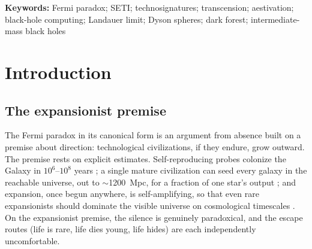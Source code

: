 \documentclass[11pt]{article}
\begin{document}
\bigskip
\noindent\textbf{Keywords:} Fermi paradox; SETI; technosignatures; transcension; aestivation; black-hole computing; Landauer limit; Dyson spheres; dark forest; intermediate-mass black holes

\newpage
\tableofcontents
\newpage

\section{Introduction}
\label{sec:intro}

\subsection{The expansionist premise}
\label{sec:expansionist}

The Fermi paradox in its canonical form \citep{Hart1975,Tipler1980,Brin1983,Webb2015,Cirkovic2018,Forgan2019} is an argument from absence built on a premise about direction: technological civilizations, if they endure, grow outward. The premise rests on explicit estimates. Self-reproducing probes colonize the Galaxy in $10^{6}$--$10^{8}$ years \citep{Tipler1980,Freitas1980,Freitas1982}; a single mature civilization can seed every galaxy in the reachable universe, out to $\sim$1200~Mpc, for a fraction of one star's output \citep{Armstrong2013}; and expansion, once begun anywhere, is self-amplifying, so that even rare expansionists should dominate the visible universe on cosmological timescales \citep{Olson2015,Hanson2021}. On the expansionist premise, the silence is genuinely paradoxical, and the escape routes (life is rare, life dies young, life hides) are each independently uncomfortable.
\end{document}
